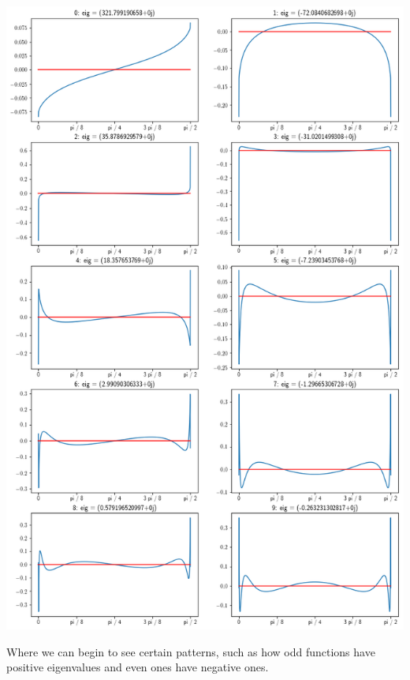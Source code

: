 \documentclass[11pt]{article}
\begin{document}
\begin{center}
\includegraphics[width=6in]{./eigFunctsVals.png}
\end{center}

Where we can begin to see certain patterns, such as how odd functions have positive eigenvalues and even ones have negative ones.
\end{document}
